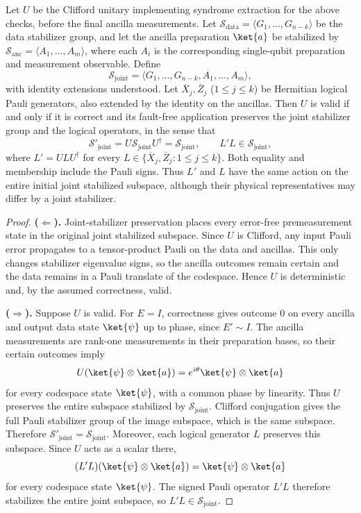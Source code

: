 \begin{theorem}
\label{thm:syndrome-extraction-valid}
Let $U$ be the Clifford unitary implementing syndrome extraction for
the above checks, before the final ancilla measurements.
Let
$\mathcal{S}_{\mathrm{data}}=\langle G_1,\ldots,G_{n-k}\rangle$
be the data stabilizer group, and let the ancilla preparation
$\ket{a}$ be stabilized by
$\mathcal{S}_{\mathrm{anc}}=\langle A_1,\ldots,A_m\rangle$,
where each $A_i$ is the corresponding single-qubit preparation and
measurement observable. Define
\[
    \mathcal{S}_{\mathrm{joint}}
    =\langle G_1,\ldots,G_{n-k},A_1,\ldots,A_m\rangle,
\]
with identity extensions understood. Let
$\overline{X}_j,\overline{Z}_j$ ($1\le j\le k$) be Hermitian logical
Pauli generators, also extended by the identity on the ancillas.
Then $U$ is valid if and only if it is correct and its fault-free
application preserves the joint stabilizer group and the logical
operators, in the sense that
\[
    \mathcal{S}'_{\mathrm{joint}}
    =U\mathcal{S}_{\mathrm{joint}}U^\dagger
    =\mathcal{S}_{\mathrm{joint}},
    \qquad
    L'L\in\mathcal{S}_{\mathrm{joint}},
\]
where $L'=ULU^\dagger$ for every
$L\in\{\overline{X}_j,\overline{Z}_j:1\le j\le k\}$.
Both equality and membership include the Pauli signs. Thus $L'$ and
$L$ have the same action on the entire initial joint stabilized
subspace, although their physical representatives may differ by a
joint stabilizer.
\end{theorem}

\begin{proof}
\textbf{($\Leftarrow$).}
Joint-stabilizer preservation places every error-free premeasurement
state in the original joint stabilized subspace. Since $U$ is Clifford,
any input Pauli error propagates to a tensor-product Pauli on the data
and ancillas. This only changes stabilizer eigenvalue signs, so the
ancilla outcomes remain certain and the data remains in a Pauli
translate of the codespace. Hence $U$ is deterministic and, by the
assumed correctness, valid.

\textbf{($\Rightarrow$).}
Suppose $U$ is valid. For $E=I$, correctness gives outcome $0$ on every
ancilla and output data state $\ket{\psi}$ up to phase, since
$E'\sim I$. The ancilla measurements are rank-one measurements in their
preparation bases, so their certain outcomes imply
\[
    U(\ket{\psi}\otimes\ket{a})
    =e^{i\theta}\ket{\psi}\otimes\ket{a}
\]
for every codespace state $\ket{\psi}$, with a common phase by linearity.
Thus $U$ preserves the entire subspace stabilized by
$\mathcal{S}_{\mathrm{joint}}$. Clifford conjugation gives the full
Pauli stabilizer group of the image subspace, which is the same
subspace. Therefore
$\mathcal{S}'_{\mathrm{joint}}=\mathcal{S}_{\mathrm{joint}}$.
Moreover, each logical generator $L$ preserves this subspace.
Since $U$ acts as a scalar there,
\[
    (L'L)(\ket{\psi}\otimes\ket{a})
    =\ket{\psi}\otimes\ket{a}
\]
for every codespace state $\ket{\psi}$.
The signed Pauli operator $L'L$ therefore stabilizes the entire joint
subspace, so $L'L\in\mathcal{S}_{\mathrm{joint}}$.
\end{proof}

